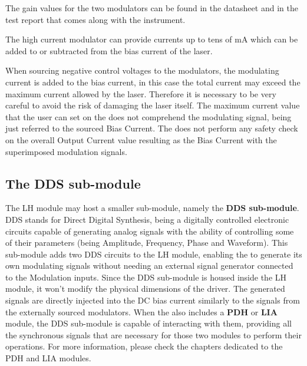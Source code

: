 The gain values for the two modulators can be found in the \QubeModel  datasheet and in the test report that comes along with the instrument.

\begin{tcolorbox}[enhanced,attach boxed title to top center={yshift=-3mm,yshifttext=-1mm},
                    colback=black!5!white, colframe=red!75!black, colbacktitle=red!80!black,
                    title=CAUTION, fonttitle=\bfseries, boxed title style={size=small, 
                    colframe=black!50!black} ]

    The high current modulator can provide currents up to tens of mA which can be added to or subtracted from the bias current of the laser.

    When sourcing negative control voltages to the modulators, the modulating current is added to the bias current, in this case the total current may exceed the maximum current allowed by the laser. Therefore it is necessary to be very careful to avoid the risk of damaging the laser itself.
    \newline The maximum current value that the user can set on the \QubeModel  does not comprehend the modulating signal, being just referred to the sourced Bias Current. The \QubeModel  does not perform any safety check on the overall Output Current value resulting as the Bias Current with the superimposed modulation signals.
\end{tcolorbox}
    
\newpage





\subsection{The DDS sub-module}
The LH module may host a smaller sub-module, namely the \textbf{DDS sub-module}. DDS stands for Direct Digital Synthesis, being a digitally controlled electronic circuits capable of generating analog signals with the ability of controlling some of their parameters (being Amplitude, Frequency, Phase and Waveform). 
\newline This sub-module adds two DDS circuits to the LH module, enabling the \QubeModel  to generate its own modulating signals without needing an external signal generator connected to the Modulation inputs. Since the DDS sub-module is housed inside the LH module, it won't modify the physical dimensions of the \QubeModel  driver.
\newline  The generated signals are directly injected into the DC bias current similarly to the signals from the externally sourced modulators.
\newline When the \QubeModel  also includes a \textbf{PDH} or \textbf{LIA} module, the DDS sub-module is capable of interacting with them, providing all the synchronous signals that are necessary for those two modules to perform their operations. For more information, please check the chapters dedicated to the PDH and LIA modules.




